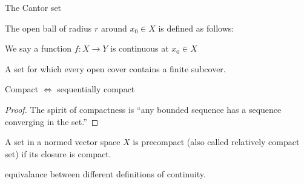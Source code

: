 The Cantor set

\begin{definition}
    The open ball of radius $r$ around $x_0\in X$ is defined as follows:
\end{definition}

\begin{definition}[Continuity]
    We say a function $f:X\rightarrow Y$ is continuous at $x_0\in X$
\end{definition}


\begin{definition}
    A set for which every open cover contains a finite subcover.
\end{definition}
\begin{theorem}
    Compact $\iff$ sequentially compact
\end{theorem}
\begin{proof}
    The spirit of compactness is ``any bounded sequence has a sequence converging in the set.''
\end{proof}

\begin{definition}
    A set in a normed vector space $X$ is precompact (also called relatively compact set) if its closure is compact.
\end{definition}

equivalance between different definitions of continuity.


